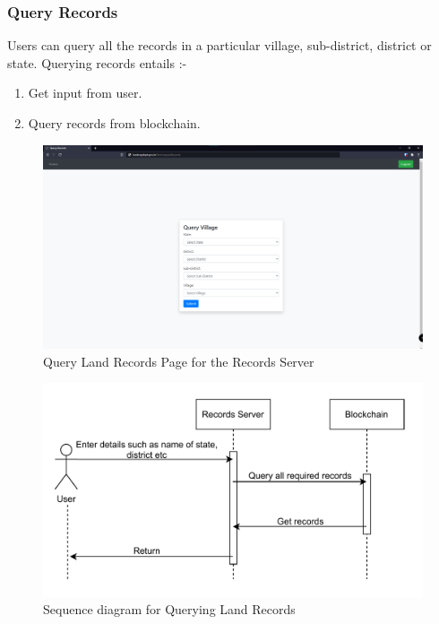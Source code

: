 \documentclass{article}
\begin{document}
           

        \subsubsection{Query Records}
            Users can query all the records in a particular village, sub-district, district or state.
            Querying records entails :-
            \begin{enumerate}
                \item Get input from user.
                \item Query records from blockchain.
            \end{enumerate}
            
            \begin{figure}[htbp]
                \includegraphics[scale=0.25]{records_query_records}
                \centering
                \caption{Query Land Records Page for the Records Server}
            \end{figure}

            \begin{figure}[htbp]
                \includegraphics[scale=0.25]{records_seq_query_records}
                \centering
                \caption{Sequence diagram for Querying Land Records}
            \end{figure}
\end{document}
